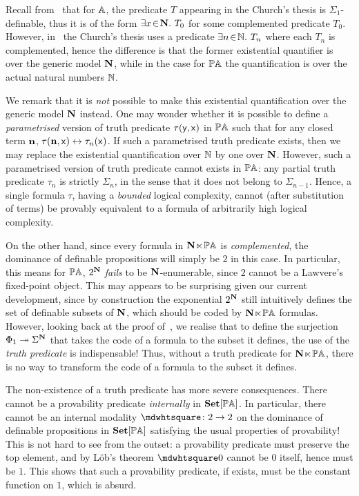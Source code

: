 \begin{remark}\label{rem:parametriesdtruthpredicate}
  Recall from~ that for $\mathbb{A}$, the predicate $T$ appearing in the Church's thesis is $\Sigma_1$-definable, thus it is of the form $\exists x\!\in\!\mathbf N.\  T_0$ for some complemented predicate $T_0$. However, in~ the Church's thesis uses a predicate $\exists n\!\in\!\mathbb{N}.\  T_n$ where each $T_n$ is complemented, hence the difference is that the former existential quantifier is over the generic model $\mathbf N$, while in the case for $\mathbb{PA}$ the quantification is over the actual natural numbers $\mathbb{N}$. 
  
  We remark that it is \emph{not} possible to make this existential quantification over the generic model $\mathbf N$ instead. One may wonder whether it is possible to define a \emph{parametrised} version of truth predicate $\tau(\mathsf{y},\mathsf{x})$ in $\mathbb{PA}$ such that for any closed term $\mathbf{n}$, $\tau(\mathbf{n},\mathsf{x}) \leftrightarrow \tau_n(\mathsf{x})$. If such a parametrised truth predicate exists, then we may replace the existential quantification over $\mathbb{N}$ by one over $\mathbf N$. However, such a parametrised version of truth predicate cannot exists in $\mathbb{PA}$: any partial truth predicate $\tau_n$ is strictly $\Sigma_n$, in the sense that it does not belong to $\Sigma_{n-1}$. Hence, a single formula $\tau$, having a \emph{bounded} logical complexity, cannot (after substitution of terms) be provably equivalent to a formula of arbitrarily high logical complexity. 
\end{remark}

On the other hand, since every formula in $\mathbf N\hspace{-.4ex}\ltimes\hspace{-.4ex}\mathbb{PA}$ is \emph{complemented}, the dominance of definable propositions will simply be $2$ in this case. In particular, this means for $\mathbb{PA}$, $2^\mathbf N$ \emph{fails} to be $\mathbf N$-enumerable, since $2$ cannot be a Lawvere's fixed-point object. This may appears to be surprising given our current development, since by construction the exponential $2^\mathbf N$ still intuitively defines the set of definable subsets of $\mathbf N$, which should be coded by $\mathbf N\hspace{-.4ex}\ltimes\hspace{-.4ex}\mathbb{PA}$ formulas. However, looking back at the proof of~, we realise that to define the surjection $\Phi_1 \twoheadrightarrow \Sigma^\mathbf N$ that takes the code of a formula to the subset it defines, the use of the \emph{truth predicate} is indispensable! Thus, without a truth predicate for $\mathbf N\hspace{-.4ex}\ltimes\hspace{-.4ex}\mathbb{PA}$, there is no way to transform the code of a formula to the subset it defines.

The non-existence of a truth predicate has more severe consequences. There cannot be a provability predicate \emph{internally} in $\mathbf{Set}[\mathbb{PA}]$. In particular, there cannot be an internal modality $\bx \colon 2 \to 2$ on the dominance of definable propositions in $\mathbf{Set}[\mathbb{PA}]$ satisfying the usual properties of provability! This is not hard to see from the outset: a provability predicate must preserve the top element, and by L\"ob's theorem $\bx 0$ cannot be $0$ itself, hence must be $1$. This shows that such a provability predicate, if exists, must be the constant function on $1$, which is absurd. 

